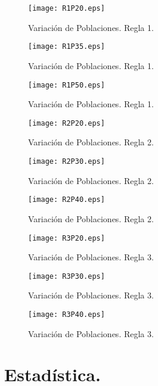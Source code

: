 \documentclass{article}
\begin{document}
\begin{figure}[htb] %
    \centering
    \texttt{[image: R1P20.eps]} %
    \caption{Variaci\'on de Poblaciones. Regla 1.}
    \label{Figura 19}
\end{figure}
\begin{figure}[htb] %
    \centering
    \texttt{[image: R1P35.eps]} %
    \caption{Variaci\'on de Poblaciones. Regla 1.}
    \label{Figura 20}
\end{figure}
\begin{figure}[htb] %
    \centering
    \texttt{[image: R1P50.eps]} %
    \caption{Variaci\'on de Poblaciones. Regla 1.}
    \label{Figura 21}
\end{figure}
\begin{figure}[htb] %
    \centering
    \texttt{[image: R2P20.eps]} %
    \caption{Variaci\'on de Poblaciones. Regla 2.}
    \label{Figura 22}
\end{figure}
\begin{figure}[htb] %
    \centering
    \texttt{[image: R2P30.eps]} %
    \caption{Variaci\'on de Poblaciones. Regla 2.}
    \label{Figura 23}
\end{figure}
\begin{figure}[htb] %
    \centering
    \texttt{[image: R2P40.eps]} %
    \caption{Variaci\'on de Poblaciones. Regla 2.}
    \label{Figura 24}
\end{figure}
\begin{figure}[htb] %
    \centering
    \texttt{[image: R3P20.eps]} %
    \caption{Variaci\'on de Poblaciones. Regla 3.}
    \label{Figura 25}
\end{figure}
\begin{figure}[htb] %
    \centering
    \texttt{[image: R3P30.eps]} %
    \caption{Variaci\'on de Poblaciones. Regla 3.}
    \label{Figura 26}
\end{figure}
\begin{figure}[htb] %
    \centering
    \texttt{[image: R3P40.eps]} %
    \caption{Variaci\'on de Poblaciones. Regla 3.}
    \label{Figura 27}
\end{figure}



\newpage

\section{Estad\'istica.}
\end{document}
